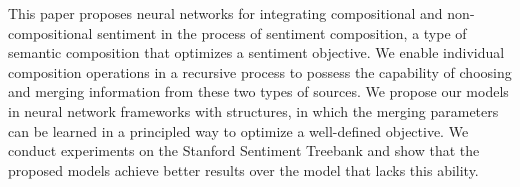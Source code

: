 This paper proposes neural networks for integrating compositional and non-compositional sentiment in the process of sentiment composition, a type of semantic composition that optimizes a sentiment objective. We enable individual composition operations in a recursive process to possess the capability of choosing and merging information from these two types of sources. We propose our models in neural network frameworks with structures, in which the merging parameters can be learned in a principled way to optimize a well-defined objective. We conduct experiments on the Stanford Sentiment Treebank and show that the proposed models achieve better results over the model that lacks this ability.
